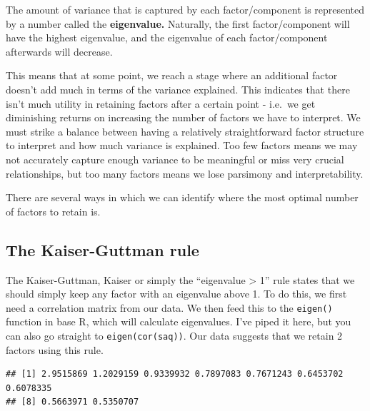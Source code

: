 \documentclass[
]{book}
\newenvironment{Shaded}{\begin{snugshade}}{\end{snugshade}}
\newcommand{\FunctionTok}[1]{\textcolor[rgb]{0.13,0.29,0.53}{\textbf{#1}}}
\newcommand{\NormalTok}[1]{#1}
\newcommand{\OtherTok}[1]{\textcolor[rgb]{0.56,0.35,0.01}{#1}}
\newcommand{\SpecialCharTok}[1]{\textcolor[rgb]{0.81,0.36,0.00}{\textbf{#1}}}
\begin{document}
The amount of variance that is captured by each factor/component is represented by a number called the \textbf{eigenvalue.} Naturally, the first factor/component will have the highest eigenvalue, and the eigenvalue of each factor/component afterwards will decrease.

This means that at some point, we reach a stage where an additional factor doesn't add much in terms of the variance explained. This indicates that there isn't much utility in retaining factors after a certain point - i.e.~we get diminishing returns on increasing the number of factors we have to interpret. We must strike a balance between having a relatively straightforward factor structure to interpret and how much variance is explained. Too few factors means we may not accurately capture enough variance to be meaningful or miss very crucial relationships, but too many factors means we lose parsimony and interpretability.

There are several ways in which we can identify where the most optimal number of factors to retain is.

\subsection{The Kaiser-Guttman rule}\label{the-kaiser-guttman-rule}

The Kaiser-Guttman, Kaiser or simply the ``eigenvalue \textgreater{} 1'' rule states that we should simply keep any factor with an eigenvalue above 1. To do this, we first need a correlation matrix from our data. We then feed this to the \texttt{eigen()} function in base R, which will calculate eigenvalues. I've piped it here, but you can also go straight to \texttt{eigen(cor(saq))}. Our data suggests that we retain 2 factors using this rule.

\begin{Shaded}
\end{Shaded}

\begin{verbatim}
## [1] 2.9515869 1.2029159 0.9339932 0.7897083 0.7671243 0.6453702 0.6078335
## [8] 0.5663971 0.5350707
\end{verbatim}
\end{document}
